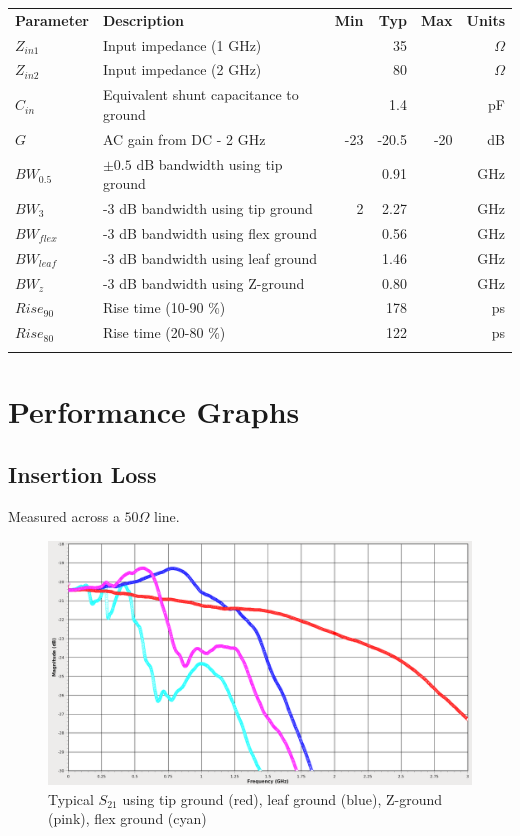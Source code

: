 \documentclass[11pt]{article}
\newcommand{\thinhline}{\Xhline{1\arrayrulewidth}}
\newcommand{\thickhline}{\Xhline{2.5\arrayrulewidth}}
\begin{document}
\begin{tabularx}{16cm}{lXrrrr}
\thickhline
\textbf{Parameter} & \textbf{Description} & \textbf{Min} & \textbf{Typ} & \textbf{Max} & \textbf{Units} \\
\thickhline
$Z_{in1}$ & Input impedance (1 GHz) & & 35 & & $\Omega$ \\
\thinhline
$Z_{in2}$ & Input impedance (2 GHz) & & 80 & & $\Omega$ \\
\thinhline
$C_{in}$ & Equivalent shunt capacitance to ground &  & 1.4 &  & pF \\
\thinhline
$G$ & AC gain from DC - 2 GHz & -23 & -20.5 & -20 & dB \\
\thinhline
$BW_{0.5}$ & $\pm 0.5$ dB bandwidth using tip ground &  & 0.91 & & GHz \\
\thinhline
$BW_{3}$ & -3 dB bandwidth using tip ground & 2 & 2.27 &  & GHz \\
\thinhline
$BW_{flex}$ & -3 dB bandwidth using flex ground &  & 0.56 &  & GHz \\
\thinhline
$BW_{leaf}$ & -3 dB bandwidth using leaf ground &  & 1.46 &  & GHz \\
\thinhline
$BW_{z}$ & -3 dB bandwidth using Z-ground &  & 0.80 &  & GHz \\
\thinhline
$Rise_{90}$ & Rise time (10-90 \%) &  & 178 &  & ps \\
\thinhline
$Rise_{80}$ & Rise time (20-80 \%) &  & 122 &  & ps \\
\thickhline
\end{tabularx}

\pagebreak
\section{Performance Graphs}

\subsection{Insertion Loss}

Measured across a $50 \Omega$ line.

\begin{figure}[h]
\centering
\includegraphics[width=14cm]{typical-s21.png}
\caption{Typical $S_{21}$ using tip ground (red), leaf ground (blue), Z-ground (pink), flex ground (cyan)}
\end{figure}
\end{document}
